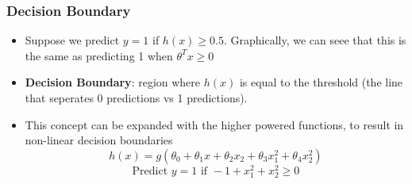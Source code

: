 \subsubsection{Decision Boundary}
\begin{itemize}[--]
	\item Suppose we predict $y=1$ if $h(x)\geq 0.5$. Graphically, we can seee that this is the same as predicting 1 when $\theta^{T}x\geq 0$
	\item \textbf{Decision Boundary}: region where $h(x)$ is equal to the threshold (the line that seperates 0 predictions vs 1 predictions).
	\item This concept can be expanded with the higher powered functions, to result in non-linear decision boundaries
	$$h(x)=g(\theta_0+\theta_1x+\theta_2 x_2 + \theta_3 x_1^2+\theta_4 x_2^2)$$
	$$\text{Predict } y=1\text{ if } -1+x_1^2+x_2^2\geq 0$$
\end{itemize}


